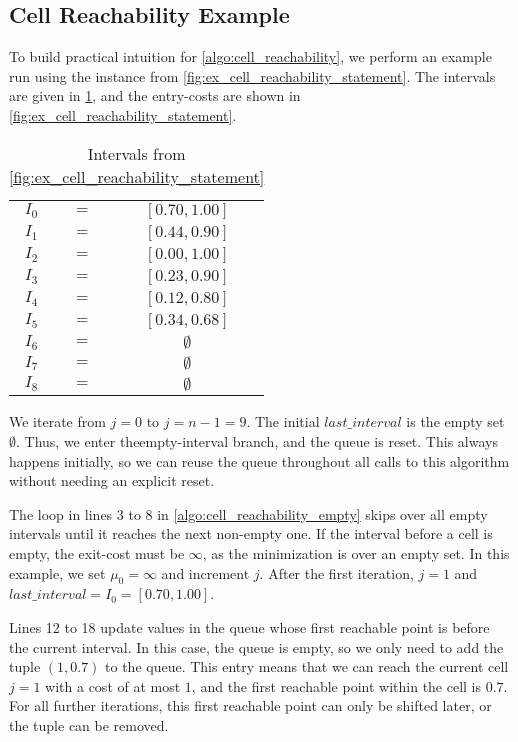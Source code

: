 \subsection{Cell Reachability Example}
\label{ssec:cell_reachability_ex}

To build practical intuition for \cref{algo:cell_reachability}, we perform an example run using the instance from \cref{fig:ex_cell_reachability_statement}. The intervals are given in \cref{tab:cell_reachability_intervals}, and the entry-costs are shown in \cref{fig:ex_cell_reachability_statement}.

\begin{table}[htb]
  \centering
	\begin{tabular}{|ccc|}
		\hline
		\(I_0\) & \(=\) & \([0.70, 1.00]\) \\
		\(I_1\) & \(=\) & \([0.44, 0.90]\) \\
		\(I_2\) & \(=\) & \([0.00, 1.00]\) \\
		\(I_3\) & \(=\) & \([0.23, 0.90]\) \\
		\(I_4\) & \(=\) & \([0.12, 0.80]\) \\
		\(I_5\) & \(=\) & \([0.34, 0.68]\) \\
		\(I_6\) & \(=\) & \(\emptyset\) \\
		\(I_7\) & \(=\) & \(\emptyset\) \\
		\(I_8\) & \(=\) & \(\emptyset\) \\
		\hline
	\end{tabular}
	\caption{Intervals from \cref{fig:ex_cell_reachability_statement}}
	\label{tab:cell_reachability_intervals}
\end{table}

We iterate from \(j = 0\) to \(j = n - 1 = 9\). The initial \(last\_interval\) is the empty set \(\emptyset\). Thus, we enter theempty-interval branch, and the queue is reset. This always happens initially, so we can reuse the queue throughout all calls to this algorithm without needing an explicit reset.

The loop in lines 3 to 8 in \cref{algo:cell_reachability_empty} skips over all empty intervals until it reaches the next non-empty one. If the interval before a cell is empty, the exit-cost must be \(\infty\), as the minimization is over an empty set. In this example, we set \(\mu_0 = \infty\) and increment \(j\). After the first iteration, \(j = 1\) and \(last\_interval = I_0 = [0.70, 1.00]\).

Lines 12 to 18 update values in the queue whose first reachable point is before the current interval. In this case, the queue is empty, so we only need to add the tuple \((1, 0.7)\) to the queue. This entry means that we can reach the current cell \(j = 1\) with a cost of at most \(1\), and the first reachable point within the cell is \(0.7\). For all further iterations, this first reachable point can only be shifted later, or the tuple can be removed.

